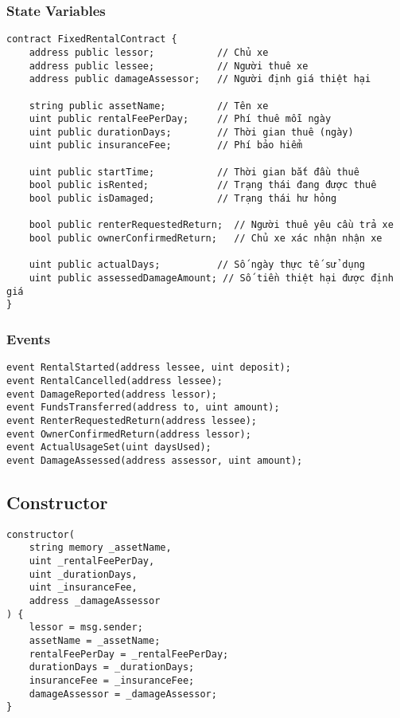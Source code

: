 \documentclass[12pt,a4paper]{article}
\begin{document}
\subsubsection{State Variables}
\begin{lstlisting}[language=Solidity, caption=Các biến trạng thái chính]
contract FixedRentalContract {
    address public lessor;           // Chủ xe
    address public lessee;           // Người thuê xe
    address public damageAssessor;   // Người định giá thiệt hại

    string public assetName;         // Tên xe
    uint public rentalFeePerDay;     // Phí thuê mỗi ngày
    uint public durationDays;        // Thời gian thuê (ngày)
    uint public insuranceFee;        // Phí bảo hiểm

    uint public startTime;           // Thời gian bắt đầu thuê
    bool public isRented;            // Trạng thái đang được thuê
    bool public isDamaged;           // Trạng thái hư hỏng

    bool public renterRequestedReturn;  // Người thuê yêu cầu trả xe
    bool public ownerConfirmedReturn;   // Chủ xe xác nhận nhận xe

    uint public actualDays;          // Số ngày thực tế sử dụng
    uint public assessedDamageAmount; // Số tiền thiệt hại được định giá
}
\end{lstlisting}

\subsubsection{Events}
\begin{lstlisting}[language=Solidity, caption=Các sự kiện trong contract]
event RentalStarted(address lessee, uint deposit);
event RentalCancelled(address lessee);
event DamageReported(address lessor);
event FundsTransferred(address to, uint amount);
event RenterRequestedReturn(address lessee);
event OwnerConfirmedReturn(address lessor);
event ActualUsageSet(uint daysUsed);
event DamageAssessed(address assessor, uint amount);
\end{lstlisting}

\subsection{Constructor}
\begin{lstlisting}[language=Solidity, caption=Hàm khởi tạo contract]
constructor(
    string memory _assetName,
    uint _rentalFeePerDay,
    uint _durationDays,
    uint _insuranceFee,
    address _damageAssessor
) {
    lessor = msg.sender;
    assetName = _assetName;
    rentalFeePerDay = _rentalFeePerDay;
    durationDays = _durationDays;
    insuranceFee = _insuranceFee;
    damageAssessor = _damageAssessor;
}
\end{lstlisting}
\end{document}
